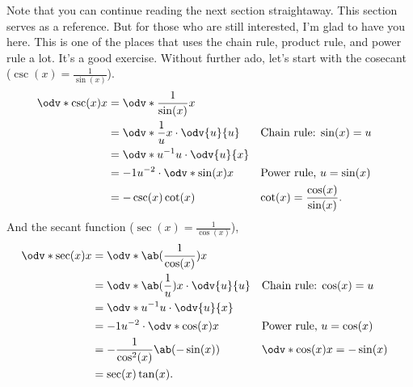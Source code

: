 Note that you can continue reading the next section straightaway. This section serves as a reference. But for those who are still interested, I'm glad to have you here. This is one of the places that uses the chain rule, product rule, and power rule a lot. It's a good exercise. Without further ado, let's start with the cosecant ($\csc(x) = \frac{1}{\sin(x)}$).
\begin{align}
	\odv*{\csc(x)}{x} & = \odv*{\frac{1}{\sin(x)}}{x}                                                               \\
	                  & = \odv*{\frac{1}{u}}{x} \cdot \odv{u}{u} &  & \textrm{Chain rule: $\sin(x) = u$}            \\
	                  & = \odv*{u^{-1}}{u} \cdot \odv{u}{x}                                                         \\
	                  & = -1u^{-2}\cdot\odv*{\sin(x)}{x}         &  & \textrm{Power rule, $u = \sin(x)$}            \\
	                  & = -\csc(x)\cot(x)                        &  & \textrm{$\cot(x) = \frac{\cos(x)}{\sin(x)}$}.
\end{align}
And the secant function ($\sec(x) = \frac{1}{\cos(x)}$),
\begin{align}
	\odv*{\sec(x)}{x} & = \odv*{\ab(\frac{1}{\cos(x)})}{x}                                                         \\
	                  & = \odv*{\ab(\frac{1}{u})}{x} \cdot \odv{u}{u} &  & \textrm{Chain rule: $\cos(x) = u$}      \\
	                  & = \odv*{u^{-1}}{u} \cdot \odv{u}{x}                                                        \\
	                  & = -1u^{-2}\cdot\odv*{\cos(x)}{x}              &  & \textrm{Power rule, $u = \cos(x)$}      \\
	                  & = -\frac{1}{\cos^{2}(x)}\ab(-\sin(x))         &  & \textrm{$\odv*{\cos(x)}{x} = -\sin(x)$} \\
	                  & = \sec(x)\tan(x).
\end{align}

